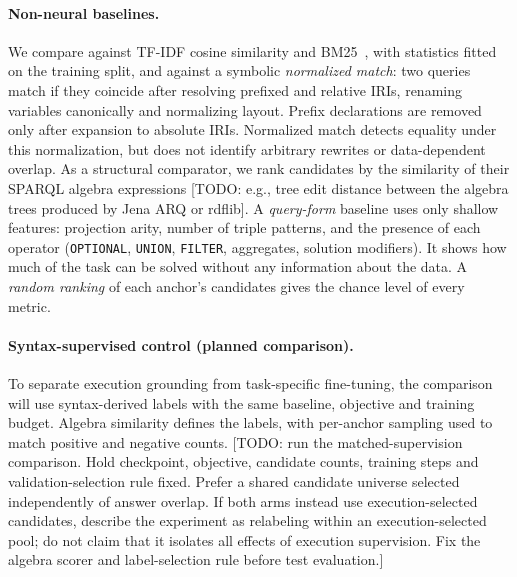\documentclass[runningheads]{llncs}
\newcommand{\hp}[1]{{\color{red!75!black}#1}}
\begin{document}
\paragraph{Non-neural baselines.}
We compare against TF-IDF cosine similarity and BM25~\cite{robertson2009bm25},
with statistics fitted on the training split, and against a symbolic
\emph{normalized match}: two queries match if they coincide after resolving
prefixed and relative IRIs, renaming variables canonically and normalizing
layout. Prefix declarations are removed only after expansion to absolute IRIs.
Normalized match detects equality under this normalization, but does not
identify arbitrary rewrites or data-dependent overlap. As a structural comparator, we rank candidates by the
similarity of their SPARQL algebra expressions
\hp{[TODO: e.g., tree edit distance between the algebra trees produced by
Jena ARQ or rdflib]}. A \emph{query-form} baseline uses only shallow features:
projection arity, number of triple patterns, and the presence of each
operator (\texttt{OPTIONAL}, \texttt{UNION}, \texttt{FILTER}, aggregates,
solution modifiers). It shows how much of the task can be solved without any
information about the data. A \emph{random ranking} of each anchor's
candidates gives the chance level of every metric.

\paragraph{Syntax-supervised control (planned comparison).}
To separate execution grounding from task-specific fine-tuning, the comparison
will use syntax-derived labels with the same baseline, objective and training
budget. Algebra similarity defines the labels, with per-anchor sampling used
to match positive and negative counts.
\hp{[TODO: run the matched-supervision comparison. Hold checkpoint,
objective, candidate counts, training steps and validation-selection rule
fixed. Prefer a shared candidate universe selected independently of answer
overlap. If both arms instead use execution-selected candidates, describe
the experiment as relabeling within an execution-selected pool; do not claim
that it isolates all effects of execution supervision. Fix the algebra
scorer and label-selection rule before test evaluation.]}
\end{document}
